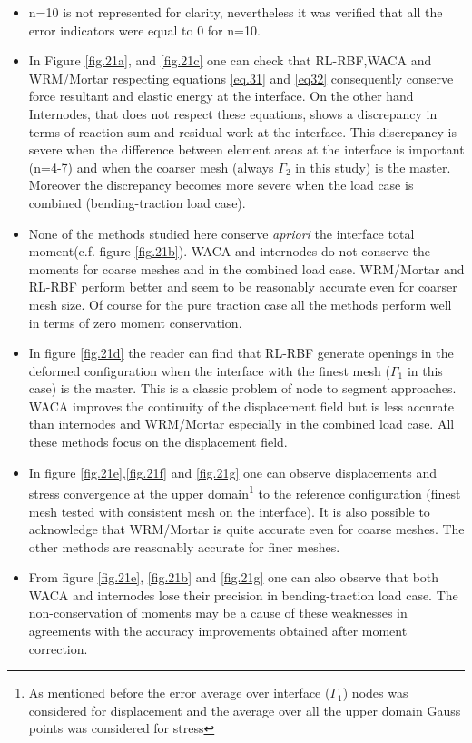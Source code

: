  \begin{itemize}
     \item n=10 is not represented for clarity, nevertheless it was verified that all the error indicators were equal to 0 for n=10.
     \item In Figure  \ref{fig.21a}, and \ref{fig.21c} one can check that RL-RBF,WACA and WRM/Mortar respecting equations \eqref{eq.31} and \eqref{eq32} consequently conserve force resultant and elastic energy at the interface. On the other hand Internodes, that does not respect these equations, shows a discrepancy in terms of reaction sum and residual work at the interface. This discrepancy is severe when the difference between element areas at the interface is important (n=4-7) and when the coarser mesh (always $\Gamma_2$ in this study) is the master. Moreover the discrepancy becomes more severe when the load case is combined (bending-traction load case).
     \item None of the methods studied here conserve \textit{apriori} the interface total moment(c.f. figure \ref{fig.21b}). WACA and internodes do not conserve the moments for coarse meshes and in the combined load case. WRM/Mortar and RL-RBF perform better and seem to be reasonably accurate even for coarser mesh size. Of course for the pure traction case all the methods perform well in terms of zero moment conservation.
     \item In figure \ref{fig.21d} the reader can find that RL-RBF generate openings in the deformed configuration when the interface with the finest mesh ($\Gamma_1$ in this case) is the master. This is a classic problem of node to segment approaches. WACA improves the continuity of the displacement field but is less accurate than internodes and WRM/Mortar especially in the combined load case. All these methods focus on the displacement field. 
     \item In figure \ref{fig.21e},\ref{fig.21f} and \ref{fig.21g} one can observe displacements and stress convergence at the upper domain\footnote{As mentioned before  the error average over interface ($\Gamma_1$) nodes was considered for displacement and the average over all the upper domain Gauss points was considered for stress} to the reference configuration (finest mesh tested with consistent mesh on the interface). It is also possible to acknowledge that WRM/Mortar is quite accurate even for coarse meshes. The other methods are reasonably accurate for finer meshes.
     \item From figure \ref{fig.21e}, \ref{fig.21b} and \ref{fig.21g} one can also observe that both WACA and internodes lose their precision in bending-traction load case. The non-conservation of moments may be a cause of these weaknesses in agreements with the accuracy improvements obtained after moment correction.

\end{itemize}
